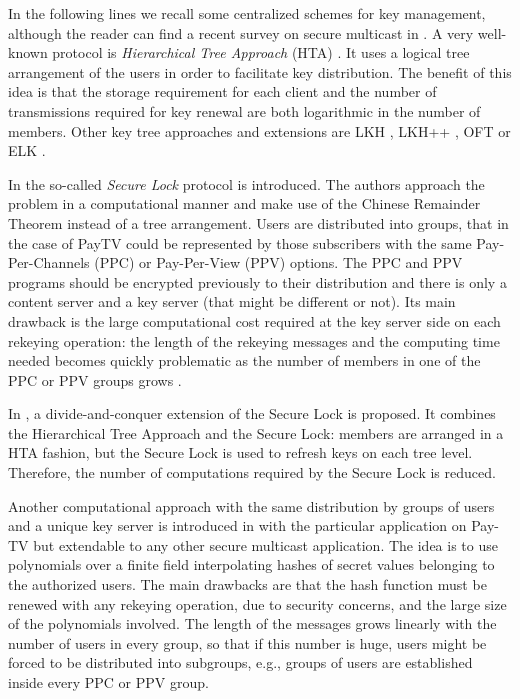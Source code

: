 \documentclass[a4paper,11pt]{amsart}
\theoremstyle{definition}
\begin{document}
In the following lines we recall some centralized schemes for key
management, although the reader can find a recent survey on secure
multicast in \cite{scalable}. A very well-known protocol is {\it
  Hierarchical Tree Approach} (HTA) \cite{RFC:2627}.
It uses a logical tree arrangement of the users in order to facilitate
key distribution. The benefit of this idea is that the storage
requirement for each client and the number of transmissions required
for key renewal are both logarithmic in the number of members. Other
key tree approaches and extensions are LKH \cite{332988}, LKH++
\cite{Pietro02efficientand}, OFT \cite{OFT2003} or ELK \cite{ELK}.

In \cite{72912} the so-called {\it Secure Lock} protocol is
introduced.  The authors approach the problem in a computational
manner and make use of the Chinese Remainder Theorem instead of a tree
arrangement.  Users are distributed into groups, that in the case of
PayTV could be represented by those subscribers with the same
Pay-Per-Channels (PPC) or Pay-Per-View (PPV) options. The PPC and PPV
programs should be encrypted previously to their distribution and
there is only a content server and a key server (that might be
different or not).  Its main drawback is the large computational cost
required at the key server side on each rekeying operation: the length
of the rekeying messages and the computing time needed becomes quickly
problematic as the number of members in one of the PPC or PPV groups
grows \cite{Naval98techniquesand}.

In \cite{1039707}, a divide-and-conquer extension of the Secure Lock
is proposed. It combines the Hierarchical Tree Approach and the Secure
Lock: members are arranged in a HTA fashion, but the Secure Lock is
used to refresh keys on each tree level. Therefore, the number of
computations required by the Secure Lock is reduced.

Another computational approach with the same distribution by groups of
users and a unique key server is introduced in \cite{cas} with the
particular application on Pay-TV but extendable to any other secure
multicast application. The idea is to use polynomials over a finite field interpolating
hashes of secret values belonging to the authorized users. The main
drawbacks are that the hash function must be renewed with any rekeying
operation, due to security concerns, and the large size of the
polynomials involved. The length of the messages grows linearly with
the number of users in every group, so that if this number is huge,
users might be forced to be distributed into subgroups, e.g., groups
of users are established inside every PPC or PPV group.
\end{document}
